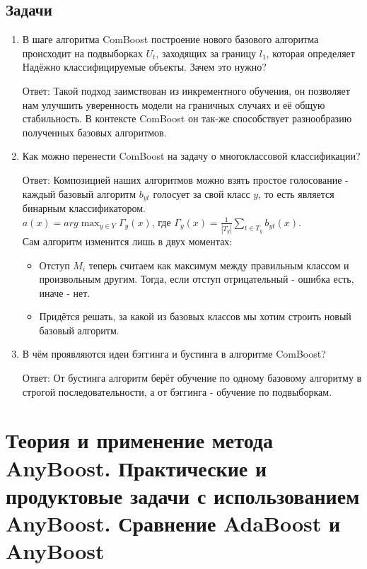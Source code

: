 \subsection{Задачи}
    
\begin{enumerate}
    \item В шаге алгоритма ComBoost построение нового базового алгоритма происходит на подвыборках $U_t$, заходящих за границу $l_1$, которая определяет Надёжно классифицируемые объекты. Зачем это нужно?
        
    Ответ: Такой подход заимствован из инкрементного обучения, он позволяет нам улучшить уверенность модели на граничных случаях и её общую стабильность. В контексте ComBoost он так-же способствует разнообразию полученных базовых алгоритмов.
    
    \item Как можно перенести ComBoost на задачу о многоклассовой классификации?
        
    Ответ: Композицией наших алгоритмов можно взять простое голосование - каждый базовый алгоритм $b_{yt}$ голосует за свой класс $y$, то есть является бинарным классификатором. \\
    $a(x)=arg\max_{y\in Y}\Gamma_y(x)$, где $\Gamma_y(x) = \frac{1}{|T_y|}\sum_{t\in T_y}b_{yt}(x)$. \\
    Сам алгоритм изменится лишь в двух моментах: \\
    \begin{itemize}
        \item Отступ $M_i$ теперь считаем как максимум между правильным классом и произвольным другим. Тогда, если отступ отрицательный - ошибка есть, иначе - нет.
        \item Придётся решать, за какой из базовых классов мы хотим строить новый базовый алгоритм.
    \end{itemize}
    
    \item В чём проявляются идеи бэггинга и бустинга в алгоритме ComBoost?
    
    Ответ: От бустинга алгоритм берёт обучение по одному базовому алгоритму в строгой последовательности, а от бэггинга - обучение по подвыборкам.
\end{enumerate}


\section*{Теория и применение метода AnyBoost. Практические и продуктовые задачи с использованием AnyBoost. Сравнение AdaBoost и AnyBoost}
